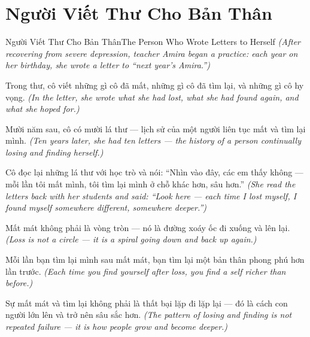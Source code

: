 \section{Người Viết Thư Cho Bản Thân}
\begin{truyen}{Người Viết Thư Cho Bản Thân}{The Person Who Wrote Letters to Herself}
\textit{(After recovering from severe depression, teacher Amira began a practice: each year on her birthday, she wrote a letter to ``next year's Amira.'')}

Trong thư, cô viết những gì cô đã mất, những gì cô đã tìm lại, và những gì cô hy vọng.
\textit{(In the letter, she wrote what she had lost, what she had found again, and what she hoped for.)}

Mười năm sau, cô có mười lá thư — lịch sử của một người liên tục mất và tìm lại mình.
\textit{(Ten years later, she had ten letters — the history of a person continually losing and finding herself.)}

Cô đọc lại những lá thư với học trò và nói: ``Nhìn vào đây, các em thấy không — mỗi lần tôi mất mình, tôi tìm lại mình ở chỗ khác hơn, sâu hơn.''
\textit{(She read the letters back with her students and said: ``Look here — each time I lost myself, I found myself somewhere different, somewhere deeper.'')}

Mất mát không phải là vòng tròn — nó là đường xoáy ốc đi xuống và lên lại.
\textit{(Loss is not a circle — it is a spiral going down and back up again.)}

Mỗi lần bạn tìm lại mình sau mất mát, bạn tìm lại một bản thân phong phú hơn lần trước.
\textit{(Each time you find yourself after loss, you find a self richer than before.)}

\end{truyen}

\begin{baihoc}
Sự mất mát và tìm lại không phải là thất bại lặp đi lặp lại — đó là cách con người lớn lên và trở nên sâu sắc hơn.
\textit{(The pattern of losing and finding is not repeated failure — it is how people grow and become deeper.)}
\end{baihoc}

